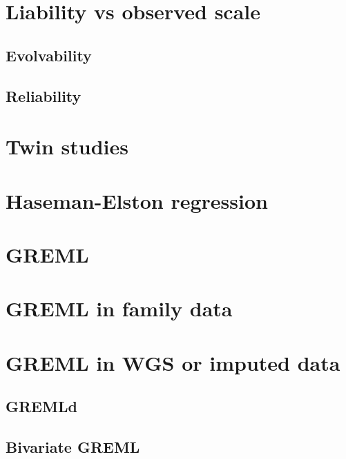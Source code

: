 \documentclass[
]{book}
\begin{document}
\hypertarget{liability-vs-observed-scale}{%
\section{Liability vs observed scale}\label{liability-vs-observed-scale}}

\hypertarget{evolvability}{%
\subsection{Evolvability}\label{evolvability}}

\hypertarget{reliability}{%
\subsection{Reliability}\label{reliability}}

\hypertarget{twin-studies}{%
\section{Twin studies}\label{twin-studies}}

\hypertarget{haseman-elston-regression}{%
\section{Haseman-Elston regression}\label{haseman-elston-regression}}

\hypertarget{greml}{%
\section{GREML}\label{greml}}

\hypertarget{greml-in-family-data}{%
\section{GREML in family data}\label{greml-in-family-data}}

\hypertarget{greml-in-wgs-or-imputed-data}{%
\section{GREML in WGS or imputed data}\label{greml-in-wgs-or-imputed-data}}

\hypertarget{gremld}{%
\subsection{GREMLd}\label{gremld}}

\hypertarget{bivariate-greml}{%
\subsection{Bivariate GREML}\label{bivariate-greml}}
\end{document}
